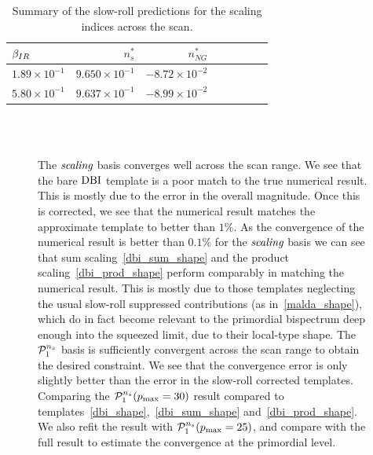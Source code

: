\begin{table}[h!]
  \begin{center}
    \begin{tabular}{lrrrrrrr}
        \toprule
        $\beta_{IR}$ &  $n_s^{*}$ &  $n_{NG}^{*}$\\
        \midrule
        $1.89\times 10^{-1}$  &  $9.650\times 10^{-1}$  &  $-8.72\times 10^{-2}$\\
        $5.80\times 10^{-1}$  &  $9.637\times 10^{-1}$  &  $-8.99\times 10^{-2}$\\
        \bottomrule
    \end{tabular}
      \caption{
          Summary of the slow-roll predictions for the scaling indices across the scan.
      }\label{tab:scan_summary_ns}
  \end{center}
\end{table}


\begin{figure}[htbp!]
\centering
    \\
    \\
\caption{
    The $\textit{scaling}$ basis converges well across the scan range.
    We see that the bare $\text{DBI}$ template is a poor match to the true numerical result.
    This is mostly due to the error in the overall magnitude.
    Once this is corrected, we see that the numerical result matches the
    approximate template to better than $1\%$. As the convergence of the
    numerical result is better than $0.1\%$ for the $\textit{scaling}$ basis
    we can see that sum scaling~\eqref{dbi_sum_shape} and the
    product scaling~\eqref{dbi_prod_shape} perform
    comparably in matching the numerical result. This is mostly
    due to those templates neglecting the usual slow-roll suppressed
    contributions (as in~\eqref{malda_shape}),
    which do in fact become relevant to the primordial
    bispectrum deep enough into the squeezed limit, due to their local-type shape.
    The $\mathcal{P}^{n_s}_1$ basis is sufficiently convergent across the scan range
    to obtain the desired constraint.
    We see that the convergence error is only slightly better than the error
    in the slow-roll corrected templates.
    Comparing the $\mathcal{P}^{n_s}_1(p_\text{max}=30)$ result compared to
    templates~\eqref{dbi_shape},~\eqref{dbi_sum_shape} and~\eqref{dbi_prod_shape}.
    We also refit the result with $\mathcal{P}^{n_s}_1(p_\text{max}=25)$, and compare with the full
    result to estimate the convergence at the primordial level.
}\label{fig:prim_conv}
\end{figure}

